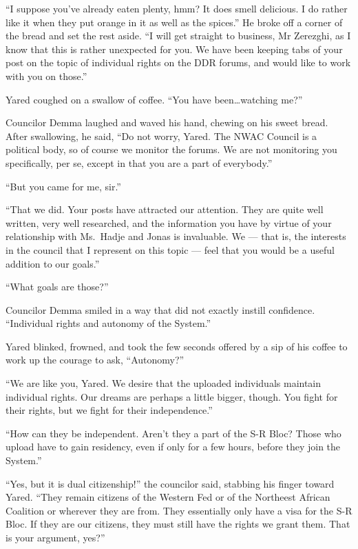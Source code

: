 ``I suppose you've already eaten plenty, hmm? It does smell delicious. I do rather like it when they put orange in it as well as the spices.'' He broke off a corner of the bread and set the rest aside. ``I will get straight to business, Mr Zerezghi, as I know that this is rather unexpected for you. We have been keeping tabs of your post on the topic of individual rights on the DDR forums, and would like to work with you on those.''

Yared coughed on a swallow of coffee. ``You have been\ldots watching me?''

Councilor Demma laughed and waved his hand, chewing on his sweet bread. After swallowing, he said, ``Do not worry, Yared. The NWAC Council is a political body, so of course we monitor the forums. We are not monitoring you specifically, per se, except in that you are a part of everybody.''

``But you came for me, sir.''

``That we did. Your posts have attracted our attention. They are quite well written, very well researched, and the information you have by virtue of your relationship with Ms.~Hadje and Jonas is invaluable. We — that is, the interests in the council that I represent on this topic — feel that you would be a useful addition to our goals.''

``What goals are those?''

Councilor Demma smiled in a way that did not exactly instill confidence. ``Individual rights and autonomy of the System.''

Yared blinked, frowned, and took the few seconds offered by a sip of his coffee to work up the courage to ask, ``Autonomy?''

``We are like you, Yared. We desire that the uploaded individuals maintain individual rights. Our dreams are perhaps a little bigger, though. You fight for their rights, but we fight for their independence.''

``How can they be independent. Aren't they a part of the S-R Bloc? Those who upload have to gain residency, even if only for a few hours, before they join the System.''

``Yes, but it is dual citizenship!'' the councilor said, stabbing his finger toward Yared. ``They remain citizens of the Western Fed or of the Northeest African Coalition or wherever they are from. They essentially only have a visa for the S-R Bloc. If they are our citizens, they must still have the rights we grant them. That is your argument, yes?''

